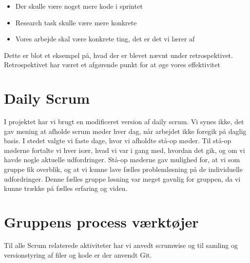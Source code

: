 \begin{itemize}
	\item Der skulle være noget mere kode  i sprintet
	\item Research task skulle være mere konkrete
	\item Vores arbejde skal være konkrete ting, det er det vi lærer af
\end{itemize}

\noindent Dette er blot et eksempel på, hvad der er blevet nævnt under retrospektivet. Retrospektivet har været et afgørende punkt for at øge vores effektivitet

\section{Daily Scrum}
I projektet har vi brugt en modificeret version af daily scrum. Vi synes ikke, det gav mening at afholde scrum møder hver dag, når arbejdet ikke foregik på daglig basis. I stedet valgte vi faste dage, hvor vi afholdte stå-op møder. Til stå-op møderne fortalte vi hver især, hvad vi var i gang med, hvordan det gik, og om vi havde nogle aktuelle udfordringer. Stå-op møderne gav mulighed for, at vi som gruppe fik overblik, og at vi kunne lave fælles problemløsning på de individuelle udfordringer. Denne fælles gruppe løsning var meget gavnlig for gruppen, da vi kunne trække på fælles erfaring og viden.

\section{Gruppens process værktøjer}
Til alle Scrum relaterede aktiviteter har vi anvedt scrumwise \cite{SCRUMWISE} og til samling og versionstyring af filer og kode er der anvendt Git\cite{GIT}. 


